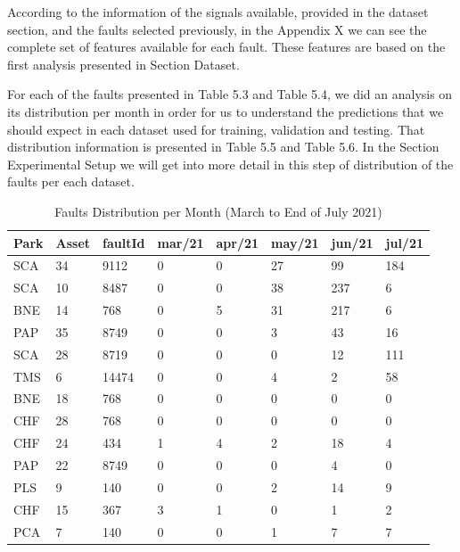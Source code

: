 According to the information of the signals available, provided in the dataset section, and the faults selected previously, in the Appendix X we can see the complete set of features available for each fault. These features are based on the first analysis presented in Section Dataset.

For each of the faults presented in Table 5.3 and Table 5.4, we did an analysis on its distribution per month in order for us to understand the predictions that we should expect in each dataset used for training, validation and testing. That distribution information is presented in Table 5.5 and Table 5.6. In the Section Experimental Setup we will get into more detail in this step of distribution of the faults per each dataset.

\begin{table}[!ht]
    \centering
    \begin{tabular}{|l|l|l|l|l|l|l|l|}
    \hline
        Park & Asset & faultId & mar/21 & apr/21 & may/21 & jun/21 & jul/21 \\ \hline
        SCA & 34 & 9112 & 0 & 0 & 27 & 99 & 184 \\ \hline
        SCA & 10 & 8487 & 0 & 0 & 38 & 237 & 6 \\ \hline
        BNE & 14 & 768 & 0 & 5 & 31 & 217 & 6 \\ \hline
        PAP & 35 & 8749 & 0 & 0 & 3 & 43 & 16 \\ \hline
        SCA & 28 & 8719 & 0 & 0 & 0 & 12 & 111 \\ \hline
        TMS & 6 & 14474 & 0 & 0 & 4 & 2 & 58 \\ \hline
        BNE & 18 & 768 & 0 & 0 & 0 & 0 & 0 \\ \hline
        CHF & 28 & 768 & 0 & 0 & 0 & 0 & 0 \\ \hline
        CHF & 24 & 434 & 1 & 4 & 2 & 18 & 4 \\ \hline
        PAP & 22 & 8749 & 0 & 0 & 0 & 4 & 0 \\ \hline
        PLS & 9 & 140 & 0 & 0 & 2 & 14 & 9 \\ \hline
        CHF & 15 & 367 & 3 & 1 & 0 & 1 & 2 \\ \hline
        PCA & 7 & 140 & 0 & 0 & 1 & 7 & 7 \\ \hline
    \end{tabular}
    \caption{Faults Distribution per Month (March to End of July 2021)}
    \label{FaultsDistribitutionMarJun21}
\end{table}

